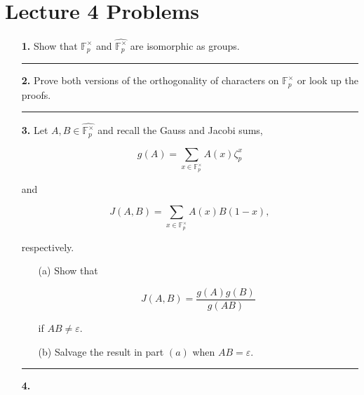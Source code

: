 \documentclass[12pt]{amsart}
\theoremstyle{definition}
\theoremstyle{remark}
\numberwithin{equation}{section}
\def \eps{\varepsilon}
\newcommand{\fp}
{\mathbb{F}_p}
\newcommand{\fphat}
{\widehat{\mathbb{F}_{p}^{\times}}}
\begin{document}
\section*{Lecture 4 Problems}

\begin{itemize}
    \item[\textbf{1.}] Show that $\fp^{\times}$ and $\fphat$ are isomorphic as groups.

    \vspace{8mm}

    \hrule{}

    \vspace{4mm}

    \item[\textbf{2.}] Prove both versions of the orthogonality of characters on $\fp^{\times}$ or look up the proofs. 

    \vspace{8mm}

    \hrule{}

    \vspace{4mm}


    \item[\textbf{3.}] Let $A,B \in \fphat$ and recall the Gauss and Jacobi sums,

    $$g(A) = \sum_{x \in \fp^{\times}} A(x) \zeta_{p}^{x}$$

    and

    $$J(A,B) = \sum_{x \in \fp^{\times}} A(x)B(1-x),$$

    respectively.

    \vspace{4mm}

    \begin{itemize}
    
    \item[(a)] Show that 

    $$J(A,B) = \frac{g(A)g(B)}{g(AB)}$$

    if $AB \neq \eps$.
    \vspace{4mm}

    \item[(b)] Salvage the result in part $(a)$ when $AB=\eps$.
    \end{itemize}

\vspace{8mm}

\hrule{}

\vspace{4mm}

\item[\textbf{4.}]


\end{itemize}
\end{document}
